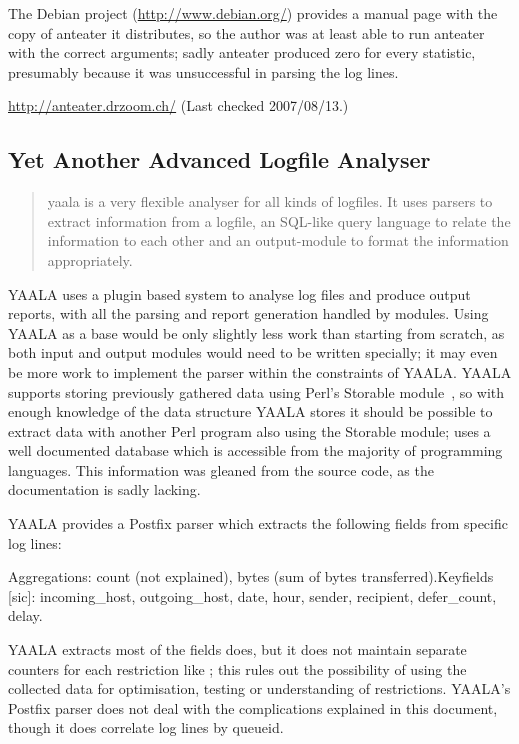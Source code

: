 The Debian project (\url{http://www.debian.org/}) provides a manual page
with the copy of anteater it distributes, so the author was at least able
to run anteater with the correct arguments; sadly anteater produced zero
for every statistic, presumably because it was unsuccessful in parsing the
log lines.

\url{http://anteater.drzoom.ch/} \newline (Last checked 2007/08/13.)

\subsection{Yet Another Advanced Logfile Analyser}

\begin{quotation}

    yaala is a very flexible analyser for all kinds of logfiles. It uses
    parsers to extract information from a logfile, an SQL-like query
    language to relate the information to each other and an output-module
    to format the information appropriately.

\end{quotation}

YAALA uses a plugin based system to analyse log files and produce \HTML{}
output reports, with all the parsing and report generation handled by
modules.  Using YAALA as a base would be only slightly less work than
starting from scratch, as both input and output modules would need to be
written specially; it may even be more work to implement the parser within
the constraints of YAALA\@.  YAALA supports storing previously gathered
data using Perl's Storable module~\cite{perl-storable}, so with enough
knowledge of the data structure YAALA stores it should be possible to
extract data with another Perl program also using the Storable module;
\parsername{} uses a well documented database which is accessible from the
majority of programming languages.  This information was gleaned from the
source code, as the documentation is sadly lacking.

YAALA provides a Postfix parser which extracts the following fields from
specific log lines:

\noindent\tab{}Aggregations: count (not explained), bytes (sum of bytes
transferred).\newline \tab{}Keyfields [sic]: incoming\_host,
outgoing\_host, date, hour, sender, recipient, defer\_count, delay.

YAALA extracts most of the fields \parsername{} does, but it does not
maintain separate counters for each restriction like \parsername{}; this
rules out the possibility of using the collected data for  optimisation,
testing or understanding of restrictions.  YAALA's Postfix parser does not
deal with the complications explained in this document, though it does
correlate log lines by queueid.

